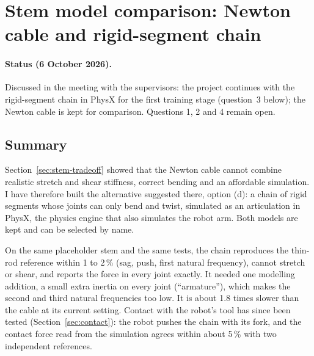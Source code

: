 
\section{Stem model comparison: Newton cable and rigid-segment chain}
\label{sec:stem-comparison}

\paragraph{Status (6 October 2026).} Discussed in the meeting with the supervisors: the project continues with
the rigid-segment chain in PhysX for the first training stage (question~3 below); the Newton cable is kept for
comparison. Questions 1, 2 and 4 remain open.

\subsection{Summary}

Section~\ref{sec:stem-tradeoff} showed that the Newton cable cannot combine realistic stretch and shear stiffness,
correct bending and an affordable simulation. I have therefore built the alternative suggested there, option
(d): a chain of rigid segments whose joints can only bend and twist, simulated as an articulation in PhysX,
the physics engine that also simulates the robot arm. Both models are kept and can be selected by name.

On the same placeholder stem and the same tests, the chain reproduces the thin-rod reference within 1 to
2\,\% (sag, push, first natural frequency), cannot stretch or shear, and reports the force in every joint
exactly. It needed one modelling addition, a small extra inertia on every joint (``armature''), which makes the
second and third natural frequencies too low. It is about 1.8 times slower than the cable at its current
setting. Contact with the robot's tool has since been tested (Section~\ref{sec:contact}): the robot pushes the
chain with its fork, and the contact force read from the simulation agrees within about 5\,\% with two
independent references.

